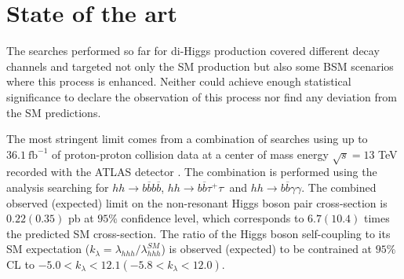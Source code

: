 
\section{State of the art}
\label{sec:backg}


The searches performed so far for di-Higgs production covered different decay channels and targeted not only the SM production but also some BSM scenarios where this process is enhanced. Neither could achieve enough statistical significance to declare the observation of this process nor find any deviation from the SM predictions. 

The most stringent limit comes from a combination of searches using up to $36.1~\text{fb}^{-1}$ of proton-proton collision data at a center of mass energy $\sqrt{s}=13$ TeV recorded with the ATLAS detector \cite{ATLAShhComb}. The combination is performed using the analysis searching for $hh\rightarrow b\overline{b}b\overline{b}$, $hh\rightarrow b\overline{b}\tau^+\tau^.$ and $hh\rightarrow b\overline{b}\gamma\gamma$. The combined observed (expected) limit on the non-resonant Higgs boson pair cross-section is $0.22(0.35)$ pb at $95\%$ confidence level, which corresponds to $6.7 (10.4)$ times the predicted SM cross-section. The ratio of the Higgs boson self-coupling to its SM expectation ($k_{\lambda}=\lambda_{hhh}/\lambda_{hhh}^{SM}$) is observed (expected) to be contrained at $95\%$ CL to $-5.0<k_{\lambda}<12.1 (-5.8<k_{\lambda}<12.0)$. 

